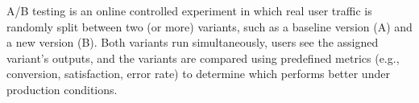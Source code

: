 \documentclass[a4paper]{article}
\title{}
\date{}
\begin{document}
    \maketitle
    
    A/B testing is an online controlled experiment in which real user traffic is randomly split between two (or more) variants, such as a baseline version (A) and a new version (B). Both variants run simultaneously, users see the assigned variant’s outputs, and the variants are compared using predefined metrics (e.g., conversion, satisfaction, error rate) to determine which performs better under production conditions.
\end{document}
